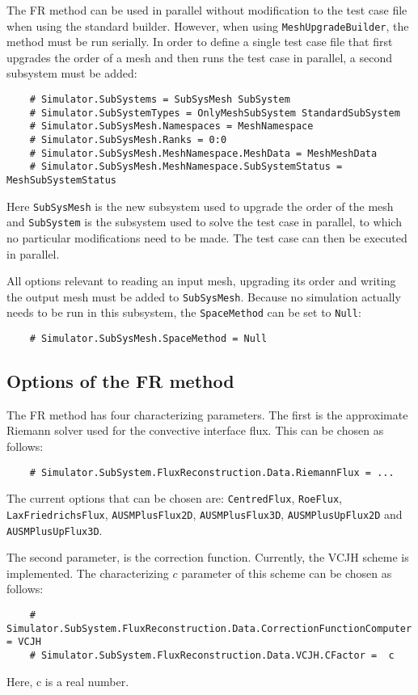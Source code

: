 \documentclass[11pt]{article}
\begin{document}
The FR method can be used in parallel without modification to the test case file when using the standard builder. However, when using {\tt MeshUpgradeBuilder}, the method must be run serially. In order to define a single test case file that first upgrades the order of a mesh and then runs the test case in parallel, a second subsystem must be added:
\begin{verbatim}
    # Simulator.SubSystems = SubSysMesh SubSystem
    # Simulator.SubSystemTypes = OnlyMeshSubSystem StandardSubSystem
    # Simulator.SubSysMesh.Namespaces = MeshNamespace
    # Simulator.SubSysMesh.Ranks = 0:0
    # Simulator.SubSysMesh.MeshNamespace.MeshData = MeshMeshData
    # Simulator.SubSysMesh.MeshNamespace.SubSystemStatus = MeshSubSystemStatus
\end{verbatim}
Here {\tt SubSysMesh} is the new subsystem used to upgrade the order of the mesh and {\tt SubSystem} is the subsystem used to solve the test case in parallel, to which no particular modifications need to be made. The test case can then be executed in parallel.

All options relevant to reading an input mesh, upgrading its order and writing the output mesh must be added to {\tt SubSysMesh}. Because no simulation actually needs to be run in this subsystem, the {\tt SpaceMethod} can be set to {\tt Null}:
\begin{verbatim}
    # Simulator.SubSysMesh.SpaceMethod = Null
\end{verbatim}

\subsection{Options of the FR method}

The FR method has four characterizing parameters. The first is the approximate Riemann solver used for the convective interface flux. This can be chosen as follows:
\begin{verbatim}
    # Simulator.SubSystem.FluxReconstruction.Data.RiemannFlux = ...
\end{verbatim}
The current options that can be chosen are: {\tt CentredFlux}, {\tt RoeFlux}, {\tt LaxFriedrichsFlux}, {\tt AUSMPlusFlux2D}, {\tt AUSMPlusFlux3D}, {\tt AUSMPlusUpFlux2D} and {\tt AUSMPlusUpFlux3D}.

The second parameter, is the correction function. Currently, the VCJH scheme is implemented. The characterizing $c$ parameter of this scheme can be chosen as follows:
\begin{verbatim}
    # Simulator.SubSystem.FluxReconstruction.Data.CorrectionFunctionComputer = VCJH
    # Simulator.SubSystem.FluxReconstruction.Data.VCJH.CFactor =  c 
\end{verbatim}
Here, c is a real number. 
\end{document}

